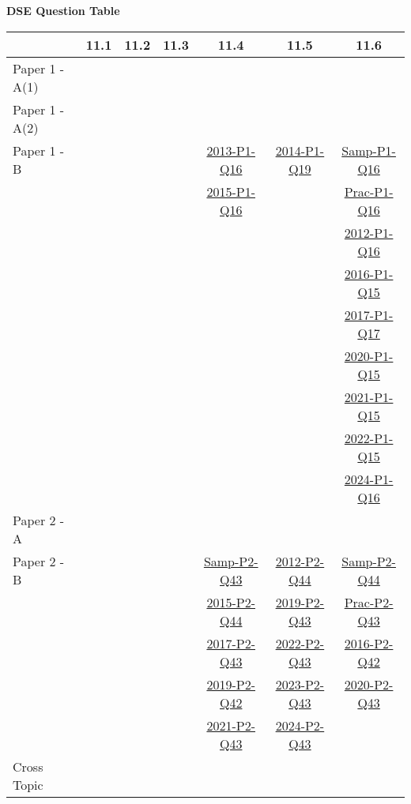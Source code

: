 \documentclass[12pt, a4paper]{article}
\begin{document}
\begin{absolutelynopagebreak}
\begin{center}
\textbf{DSE Question Table}
\end{center}
\begin{center}
\begin{tabular}{|l|c|c|c|c|c|c|}
\hline
        & 11.1 & 11.2 & 11.3 & 11.4 & 11.5 & 11.6 \\\hline
\hline
Paper 1 - A(1)&  &  &  &  &  &  \\
\hline
Paper 1 - A(2)&  &  &  &  &  &  \\
\hline
Paper 1 - B&  &  &  & \hyperref[DSE2013-CoreP1-Q16]{2013-P1-Q16} & \hyperref[DSE2014-CoreP1-Q19]{2014-P1-Q19} & \hyperref[DSE2012S-CoreP1-Q16]{Samp-P1-Q16} \\
&  &  &  & \hyperref[DSE2015-CoreP1-Q16]{2015-P1-Q16} &  & \hyperref[DSE2012P-CoreP1-Q16]{Prac-P1-Q16} \\
&  &  &  &  &  & \hyperref[DSE2012-CoreP1-Q16]{2012-P1-Q16} \\
&  &  &  &  &  & \hyperref[DSE2016-CoreP1-Q15]{2016-P1-Q15} \\
&  &  &  &  &  & \hyperref[DSE2017-CoreP1-Q17]{2017-P1-Q17} \\
&  &  &  &  &  & \hyperref[DSE2020-CoreP1-Q15]{2020-P1-Q15} \\
&  &  &  &  &  & \hyperref[DSE2021-CoreP1-Q15]{2021-P1-Q15} \\
&  &  &  &  &  & \hyperref[DSE2022-CoreP1-Q15]{2022-P1-Q15} \\
&  &  &  &  &  & \hyperref[DSE2024-CoreP1-Q16]{2024-P1-Q16} \\
\hline
\hline
Paper 2 - A&  &  &  &  &  &  \\
\hline
Paper 2 - B&  &  &  & \hyperref[DSE2012S-CoreP2-Q43]{Samp-P2-Q43} & \hyperref[DSE2012-CoreP2-Q44]{2012-P2-Q44} & \hyperref[DSE2012S-CoreP2-Q44]{Samp-P2-Q44} \\
&  &  &  & \hyperref[DSE2015-CoreP2-Q44]{2015-P2-Q44} & \hyperref[DSE2019-CoreP2-Q43]{2019-P2-Q43} & \hyperref[DSE2012P-CoreP2-Q43]{Prac-P2-Q43} \\
&  &  &  & \hyperref[DSE2017-CoreP2-Q43]{2017-P2-Q43} & \hyperref[DSE2022-CoreP2-Q43]{2022-P2-Q43} & \hyperref[DSE2016-CoreP2-Q42]{2016-P2-Q42} \\
&  &  &  & \hyperref[DSE2019-CoreP2-Q42]{2019-P2-Q42} & \hyperref[DSE2023-CoreP2-Q43]{2023-P2-Q43} & \hyperref[DSE2020-CoreP2-Q43]{2020-P2-Q43} \\
&  &  &  & \hyperref[DSE2021-CoreP2-Q43]{2021-P2-Q43} & \hyperref[DSE2024-CoreP2-Q43]{2024-P2-Q43} &  \\
\hline
\hline
Cross Topic&  &  &  &  &  &  \\
\hline
\end{tabular}
\end{center}
\end{absolutelynopagebreak}
\end{document}
